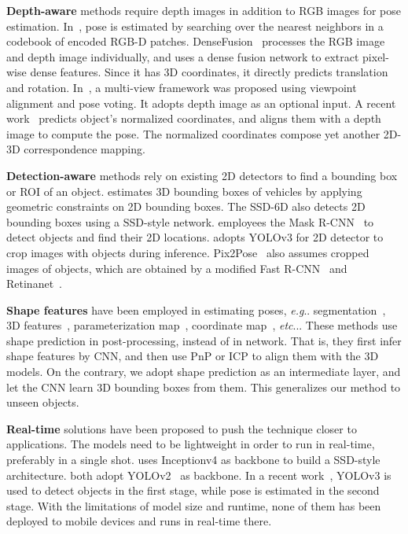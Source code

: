 \documentclass[runningheads]{llncs}
\makeatletter
\DeclareRobustCommand\onedot{\futurelet\@let@token\@onedot}
\def\@onedot{\ifx\@let@token.\else.\null\fi\xspace}
\def\eg{\emph{e.g}\onedot} \def\Eg{\emph{E.g}\onedot}
\def\etc{\emph{etc}\onedot} \def\vs{\emph{vs}\onedot}
\makeatother
\begin{document}
\textbf{Depth-aware} methods require depth images in addition to RGB images for pose estimation. In~\cite{Kehl_2016_RGBD}, pose is estimated by searching over the nearest neighbors in a codebook of encoded RGB-D patches. DenseFusion~\cite{Wang_2019_DenseFusion} processes the RGB image and depth image individually, and uses a dense fusion network to extract pixel-wise dense features. Since it has 3D coordinates, it directly predicts translation and rotation. In~\cite{Li_2018_MVMC}, a multi-view framework was proposed using viewpoint alignment and pose voting. It adopts depth image as an optional input. A recent work~\cite{Wang_2019_NOCS} predicts object's normalized coordinates, and aligns them with a depth image to compute the pose. The normalized coordinates compose yet another 2D-3D correspondence mapping.

\textbf{Detection-aware} methods rely on existing 2D detectors to find a bounding box or ROI of an object. \cite{Mousavian_2017_BBox} estimates 3D bounding boxes of vehicles by applying geometric constraints on 2D bounding boxes. The SSD-6D also detects 2D bounding boxes using a SSD-style network. \cite{Wang_2019_NOCS} employees the Mask R-CNN~\cite{He_2017_MaskRCNN} to detect objects and find their 2D locations. \cite{Li_2019_CDPN} adopts YOLOv3 for 2D detector to crop images with objects during inference. Pix2Pose~\cite{Park_2019_Pix2Pose} also assumes cropped images of objects, which are obtained by a modified Fast R-CNN~\cite{Ren_2015_Faster} and Retinanet~\cite{Lin_2017_Focal}.

\textbf{Shape features} have been employed in estimating poses, \eg segmentation~\cite{Rad_2017_BB8,Hu_2019_Segmentation}, 3D features~\cite{Peng_2019_PVNet}, parameterization map~\cite{Zakharov_2019_DPOD}, coordinate map~\cite{Wang_2019_NOCS,Li_2019_CDPN,Park_2019_Pix2Pose}, \etc. These methods use shape prediction in post-processing, instead of in network. That is, they first infer shape features by CNN, and then use PnP or ICP to align them with the 3D models. On the contrary, we adopt shape prediction as an intermediate layer, and let the CNN learn 3D bounding boxes from them. This generalizes our method to unseen objects.

\textbf{Real-time} solutions have been proposed to push the technique closer to applications. The models need to be lightweight in order to run in real-time, preferably in a single shot. \cite{Kehl_2017_SSD6D} uses Inceptionv4 as backbone to build a SSD-style architecture. \cite{Tekin_2018_SingleShot,Hu_2019_Segmentation} both adopt YOLOv2~\cite{Redmon_2016_YOLOv2} as backbone. In a recent work~\cite{Li_2019_CDPN}, YOLOv3 is used to detect objects in the first stage, while pose is estimated in the second stage. With the limitations of model size and runtime, none of them has been deployed to mobile devices and runs in real-time there.
\end{document}
